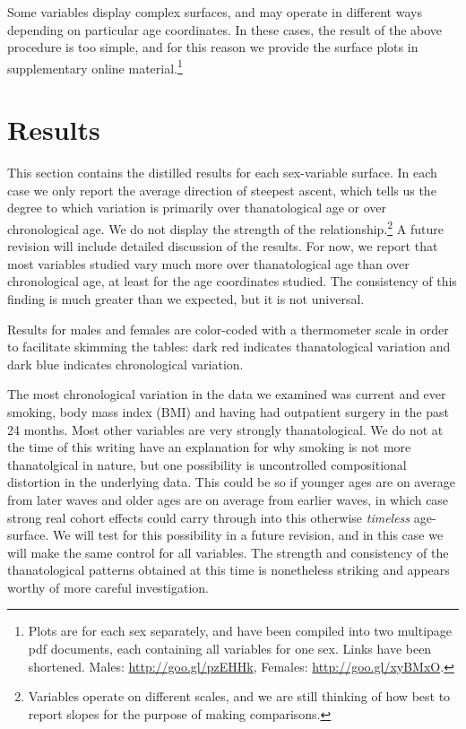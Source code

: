 \documentclass{article}
\begin{document}
Some variables display complex surfaces, and may operate in different ways
depending on particular age coordinates. In these cases, the result of the above
procedure is too simple, and for this reason we provide the surface plots in supplementary online
material.\footnote{Plots are for each sex separately, and have been compiled
into two multipage pdf documents, each containing all variables for one sex.
Links have been shortened.
Males:
\url{http://goo.gl/pzEHHk}, Females:
\url{http://goo.gl/xyBMxO}.}



\section{Results}
This section contains the distilled results for each sex-variable surface. In
each case we only report the average direction of steepest ascent, which tells
us the degree to which variation is primarily over thanatological age or over
chronological age. We do not display the strength of the
relationship.\footnote{Variables operate on different scales, and we are still
thinking of how best to report slopes for the purpose of making comparisons. }
A future revision will include detailed discussion of the results. For now, we
report that most variables studied vary much more over thanatological age
than over chronological age, at least for the age coordinates studied. The
consistency of this finding is much greater than we expected, but it is not
universal. 

Results for males and females are color-coded with a thermometer scale in order
to facilitate skimming the tables: dark red indicates thanatological variation and dark blue
indicates chronological variation. 

The most chronological variation in the data we examined was current and ever
smoking, body mass index (BMI) and having had outpatient surgery in the past 24
months. Most other variables are very strongly thanatological. We do not at the
time of this writing have an explanation for why smoking is not more
thanatolgical in nature, but one possibility is uncontrolled compositional
distortion in the underlying data. This could be so if younger ages are on
average from later waves and older ages are on average from earlier waves, in
which case strong real cohort effects could carry through into this otherwise
\textit{timeless} age-surface. We will test for this possibility in a future
revision, and in this case we will make the same control for all variables. The
strength and consistency of the thanatological patterns obtained at this time is
nonetheless striking and appears worthy of more careful
investigation.
\end{document}

